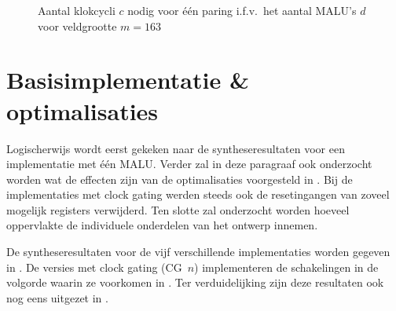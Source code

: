 \begin{figure}[h]
	\centering
		\caption{Aantal klokcycli $c$ nodig voor \'e\'en paring i.f.v.\ het aantal MALU's $d$ voor veldgrootte $m = 163$\label{figuur-resultaten-multi-cycles}}
\end{figure}

\section{Basisimplementatie \& optimalisaties\label{section-resultaten-basisimplementatie}}

Logischerwijs wordt eerst gekeken naar de syntheseresultaten voor een implementatie met \'e\'en MALU. Verder zal in deze paragraaf ook onderzocht worden wat de effecten zijn van de optimalisaties voorgesteld in . Bij de implementaties met clock gating werden steeds ook de resetingangen van zoveel mogelijk registers verwijderd. Ten slotte zal onderzocht worden hoeveel oppervlakte de individuele onderdelen van het ontwerp innemen.

De syntheseresultaten voor de vijf verschillende implementaties worden gegeven in . De versies met clock gating (CG~$n$) implementeren de schakelingen in de volgorde waarin ze voorkomen in . Ter verduidelijking zijn deze resultaten ook nog eens uitgezet in .


